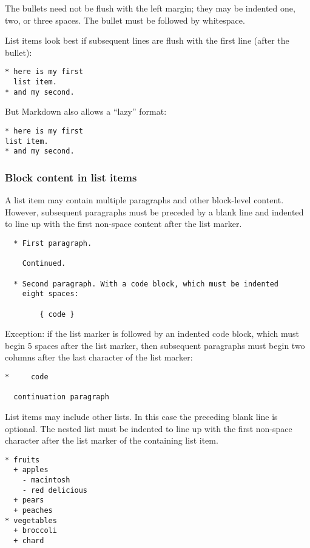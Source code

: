 \documentclass[
  a4paper,
]{article}
\begin{document}
The bullets need not be flush with the left margin; they may be indented
one, two, or three spaces. The bullet must be followed by whitespace.

List items look best if subsequent lines are flush with the first line
(after the bullet):

\begin{verbatim}
* here is my first
  list item.
* and my second.
\end{verbatim}

But Markdown also allows a ``lazy'' format:

\begin{verbatim}
* here is my first
list item.
* and my second.
\end{verbatim}

\hypertarget{block-content-in-list-items}{%
\subsubsection{Block content in list
items}\label{block-content-in-list-items}}

A list item may contain multiple paragraphs and other block-level
content. However, subsequent paragraphs must be preceded by a blank line
and indented to line up with the first non-space content after the list
marker.

\begin{verbatim}
  * First paragraph.

    Continued.

  * Second paragraph. With a code block, which must be indented
    eight spaces:

        { code }
\end{verbatim}

Exception: if the list marker is followed by an indented code block,
which must begin 5 spaces after the list marker, then subsequent
paragraphs must begin two columns after the last character of the list
marker:

\begin{verbatim}
*     code

  continuation paragraph
\end{verbatim}

List items may include other lists. In this case the preceding blank
line is optional. The nested list must be indented to line up with the
first non-space character after the list marker of the containing list
item.

\begin{verbatim}
* fruits
  + apples
    - macintosh
    - red delicious
  + pears
  + peaches
* vegetables
  + broccoli
  + chard
\end{verbatim}
\end{document}
